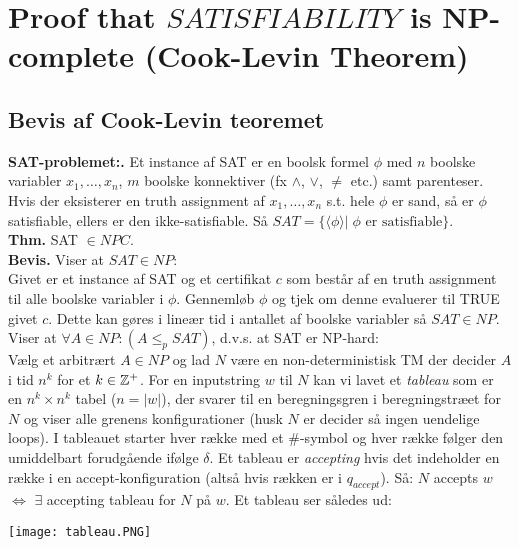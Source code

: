 \section{Proof that $SATISFIABILITY$ is NP-complete (Cook-Levin Theorem)}

\subsection*{Bevis af Cook-Levin teoremet}

\textbf{SAT-problemet:.} Et instance af SAT er en boolsk formel $\phi$ med $n$ boolske variabler $x_1,\ldots,x_n$, $m$ boolske konnektiver (fx $\wedge$, $\vee$, $\ne$ etc.) samt parenteser. Hvis der eksisterer en truth assignment af $x_1,\ldots, x_n$ s.t. hele $\phi$ er sand, så er $\phi$ satisfiable, ellers er den ikke-satisfiable. Så $SAT=\{\langle \phi \rangle | \; \phi \text{ er satisfiable}\}$. \\

\textbf{Thm.} SAT $\in NPC$. \\

\textbf{Bevis.} Viser at $SAT \in NP$: \\

Givet er et instance af SAT og et certifikat $c$ som består af en truth assignment til alle boolske variabler i $\phi$. Gennemløb $\phi$ og tjek om denne evaluerer til TRUE givet $c$. Dette kan gøres i lineær tid i antallet af boolske variabler så $SAT \in NP$. \\

Viser at $\forall A \in NP: (A \le_p SAT)$, d.v.s. at SAT er NP-hard: \\

Vælg et arbitrært $A \in NP$ og lad $N$ være en non-deterministisk TM der decider $A$ i tid $n^k$ for et $k \in \mathbb{Z}^+$. For en inputstring $w$ til $N$ kan vi lavet et \textit{tableau} som er en $n^k \times n^k$ tabel ($n = |w|$), der svarer til en beregningsgren i beregningstræet for $N$ og viser alle grenens konfigurationer (husk $N$ er decider så ingen uendelige loops). I tableauet starter hver række med et $\#$-symbol og hver række følger den umiddelbart forudgående ifølge $\delta$. Et tableau er \textit{accepting} hvis det indeholder en række i en accept-konfiguration (altså hvis rækken er i $q_{accept}$). Så: $N$ accepts $w$ $\Longleftrightarrow$ $\exists$ accepting tableau for $N$ på $w$. Et tableau ser således ud: 

\begin{center}
	\texttt{[image: tableau.PNG]}
\end{center}

